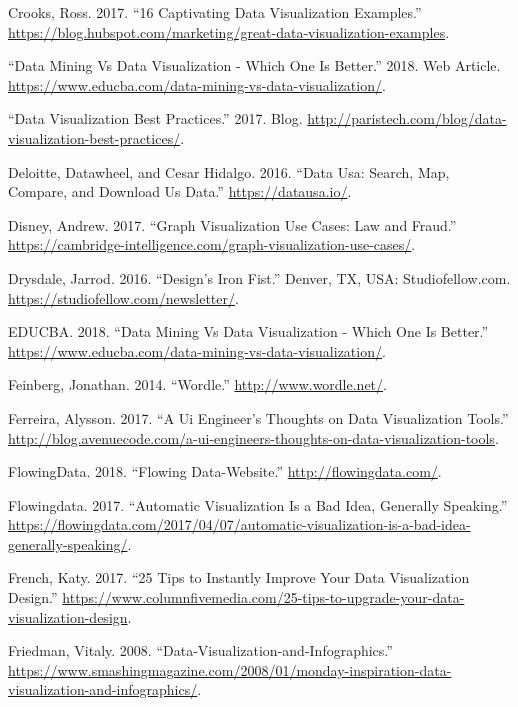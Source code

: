 \documentclass[]{book}
\theoremstyle{definition}
\theoremstyle{definition}
\theoremstyle{definition}
\theoremstyle{remark}
\begin{document}
\hypertarget{ref-int_viz_capt}{}
Crooks, Ross. 2017. ``16 Captivating Data Visualization Examples.''
\url{https://blog.hubspot.com/marketing/great-data-visualization-examples}.

\hypertarget{ref-datamining_vs_viz}{}
``Data Mining Vs Data Visualization - Which One Is Better.'' 2018. Web
Article.
\url{https://www.educba.com/data-mining-vs-data-visualization/}.

\hypertarget{ref-VizBP}{}
``Data Visualization Best Practices.'' 2017. Blog.
\url{http://paristech.com/blog/data-visualization-best-practices/}.

\hypertarget{ref-DataUSA}{}
Deloitte, Datawheel, and Cesar Hidalgo. 2016. ``Data Usa: Search, Map,
Compare, and Download Us Data.'' \url{https://datausa.io/}.

\hypertarget{ref-lawfraud}{}
Disney, Andrew. 2017. ``Graph Visualization Use Cases: Law and Fraud.''
\url{https://cambridge-intelligence.com/graph-visualization-use-cases/}.

\hypertarget{ref-Design_Iron_Fist}{}
Drysdale, Jarrod. 2016. ``Design's Iron Fist.'' Denver, TX, USA:
Studiofellow.com. \url{https://studiofellow.com/newsletter/}.

\hypertarget{ref-data_mining}{}
EDUCBA. 2018. ``Data Mining Vs Data Visualization - Which One Is
Better.''
\url{https://www.educba.com/data-mining-vs-data-visualization/}.

\hypertarget{ref-wordle}{}
Feinberg, Jonathan. 2014. ``Wordle.'' \url{http://www.wordle.net/}.

\hypertarget{ref-UI_engineer}{}
Ferreira, Alysson. 2017. ``A Ui Engineer's Thoughts on Data
Visualization Tools.''
\url{http://blog.avenuecode.com/a-ui-engineers-thoughts-on-data-visualization-tools}.

\hypertarget{ref-flowingdata}{}
FlowingData. 2018. ``Flowing Data-Website.''
\url{http://flowingdata.com/}.

\hypertarget{ref-auto_viz}{}
Flowingdata. 2017. ``Automatic Visualization Is a Bad Idea, Generally
Speaking.''
\url{https://flowingdata.com/2017/04/07/automatic-visualization-is-a-bad-idea-generally-speaking/}.

\hypertarget{ref-French}{}
French, Katy. 2017. ``25 Tips to Instantly Improve Your Data
Visualization Design.''
\url{https://www.columnfivemedia.com/25-tips-to-upgrade-your-data-visualization-design}.

\hypertarget{ref-viz}{}
Friedman, Vitaly. 2008. ``Data-Visualization-and-Infographics.''
\url{https://www.smashingmagazine.com/2008/01/monday-inspiration-data-visualization-and-infographics/}.
\end{document}
